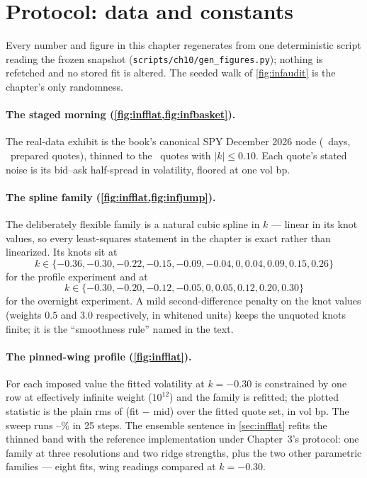 \section{Protocol: data and constants}
\label{app:infprotocol}

Every number and figure in this chapter regenerates from one
deterministic script reading the frozen snapshot
(\texttt{scripts/ch10/gen\_figures.py}); nothing is refetched and no
stored fit is altered.  The seeded walk of \cref{fig:infaudit} is
the chapter's only randomness.

\paragraph{The staged morning (\cref{fig:infflat,fig:infbasket}).}
The real-data exhibit is the book's canonical SPY December 2026 node
(\MacPriorFlatHeroDays\ days, \MacPriorFlatNFull\ prepared quotes),
thinned to the \MacPriorFlatNThin\ quotes with
$\lvert k\rvert\le0.10$.  Each quote's stated noise is its bid--ask
half-spread in volatility, floored at one vol bp.

\paragraph{The spline family
(\cref{fig:infflat,fig:infjump}).}
The deliberately flexible family is a natural cubic spline in $k$
--- linear in its knot values, so every least-squares statement in
the chapter is exact rather than linearized.  Its knots sit at
\[
k\in\{-0.36,-0.30,-0.22,-0.15,-0.09,-0.04,0,0.04,0.09,0.15,0.26\}
\]
for the profile experiment and at
\[
k\in\{-0.30,-0.20,-0.12,-0.05,0,0.05,0.12,0.20,0.30\}
\]
for the overnight experiment.  A mild second-difference penalty on
the knot values (weights $0.5$ and $3.0$ respectively, in whitened
units) keeps the unquoted knots finite; it is the ``smoothness
rule'' named in the text.

\paragraph{The pinned-wing profile (\cref{fig:infflat}).}
For each imposed value the fitted volatility at $k=-0.30$ is
constrained by one row at effectively infinite weight ($10^{12}$)
and the family is refitted; the plotted statistic is the plain rms
of (fit $-$ mid) over the fitted quote set, in vol bp.  The sweep
runs \MacPriorFlatPinLoPct--\MacPriorFlatPinHiPct\% in 25 steps.
The ensemble sentence in \cref{sec:infflat} refits the thinned band
with the reference implementation under Chapter~3's protocol: one
family at three resolutions and two ridge strengths, plus the two
other parametric families --- eight fits, wing readings compared at
$k=-0.30$.

